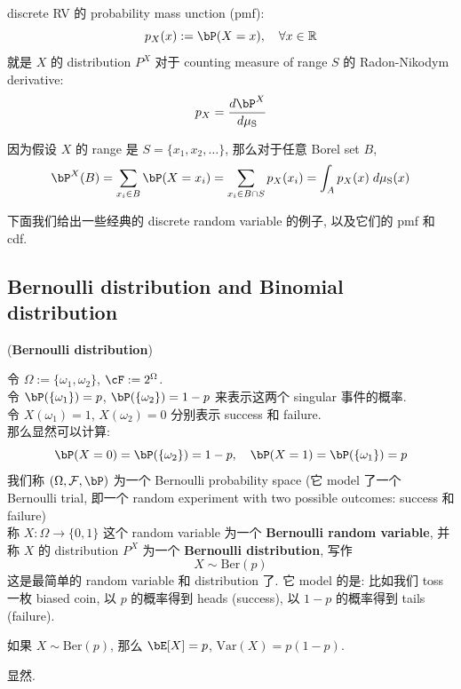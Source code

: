 discrete RV 的 probability mass unction (pmf):
        \[
        p_X(x) := \bP(X = x), \quad \forall x \in \mathbb{R}
        \]
就是 \(X\) 的 distribution \(P^X\) 对于 counting measure of range \(S\)
的 Radon-Nikodym derivative:
     \[
     p_X = \frac{d\bP^X}{d\mu_{\text{S}}}
     \]

因为假设 \(X\) 的 range 是 \(S = \{x_1, x_2, \ldots\}\), 
    那么对于任意 Borel set \(B\),
    \[
    \bP^X(B) = \sum_{x_i \in B} \bP(X = x_i) = \sum_{x_i \in B\cap S} p_X(x_i) = 
    \int_A p_X(x) \;d\mu_{\text{S}}(x)
     \]     



下面我们给出一些经典的 discrete random variable 的例子, 以及它们的 pmf 和 cdf.

\subsection{Bernoulli distribution and Binomial distribution}
\begin{example}{(\textbf{Bernoulli distribution})}
    
    令 \(\Omega:= \{\omega_1, \omega_2\}\), \(\cF := 2^{\Omega}\).\\
    令 \(\bP(\{\omega_1\}) = p\), \(\bP(\{\omega_2\}) = 1-p\) 来表示这两个 singular 事件的概率.\\
    令 \(X(\omega_1) = 1\), \(X(\omega_2) = 0\) 分别表示 success 和 failure.\\
    那么显然可以计算:
    \[
    \bP(X=0) = \bP(\{\omega_2\}) = 1-p, \quad \bP(X=1) = \bP(\{\omega_1\}) = p
    \]
    我们称 \((\Omega, \mathcal{F}, \bP)\) 为一个 Bernoulli probability space 
    (它 model 了一个 Bernoulli trial, 即一个 random experiment with two possible outcomes: success 和 failure)\\
    称 \(X: \Omega \to \{0,1\}\) 这个 random variable 为一个 \textbf{Bernoulli random variable},
    并称 \(X\) 的 distribution \(P^X\) 为一个 \textbf{Bernoulli distribution}, 写作
    \[
    X \sim \text{Ber}(p)
    \]
    这是最简单的 random variable 和 distribution 了. 它 model 的是: 
    比如我们 toss 一枚 biased coin, 
    以 \(p\) 的概率得到 heads (success), 
    以 \(1-p\) 的概率得到 tails (failure).\\
\end{example}

\begin{proposition}
    如果 \(X \sim \text{Ber}(p)\), 
    那么 \(\bE[X] = p\), \(\text{Var}(X) = p(1-p)\).
\end{proposition}
显然.

